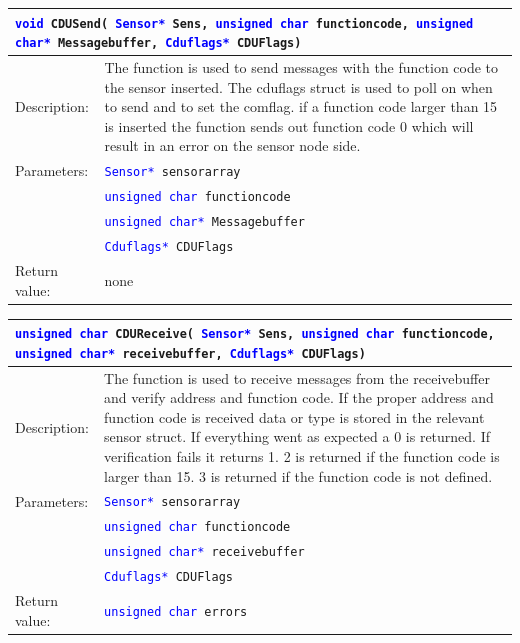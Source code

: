\begin{table}[H]
\begin{tabular}{l p{12.5cm}}
\multicolumn{2}{p{15cm}}{\texttt{\textcolor{blue}{void} CDUSend( \texttt{\textcolor{blue}{Sensor*} Sens, \textcolor{blue}{unsigned char} functioncode, \textcolor{blue}{unsigned char*} Messagebuffer, \textcolor{blue}{Cduflags*} CDUFlags})}} \\
\hline
Description:& The function is used to send messages with the function code to the sensor inserted. The cduflags struct is used to poll on when to send and to set the comflag. if a function code larger than 15 is inserted the function sends out function code 0 which will result in an error on the sensor node side.\\
Parameters:&\texttt{\textcolor{blue}{Sensor*} sensorarray}\\
&\texttt{\textcolor{blue}{unsigned char} functioncode}\\
&\texttt{\textcolor{blue}{unsigned char*} Messagebuffer}\\
&\texttt{\textcolor{blue}{Cduflags*} CDUFlags}\\
Return value:&none\\
\end{tabular}
\end{table}

\begin{table}[H]
\begin{tabular}{l p{12.5cm}}
\multicolumn{2}{p{15cm}}{\texttt{\textcolor{blue}{unsigned char} CDUReceive( \texttt{\textcolor{blue}{Sensor*} Sens, \textcolor{blue}{unsigned char} functioncode, \textcolor{blue}{unsigned char*} receivebuffer, \textcolor{blue}{Cduflags*} CDUFlags})}} \\
\hline
Description:& The function is used to receive messages from the receivebuffer and verify address and function code. If the proper address and function code is received data or type is stored in the relevant sensor struct. If everything went as expected a 0 is returned. If verification fails it returns 1.  2 is returned if the function code is larger than 15. 3 is returned if the function code is not defined.\\
Parameters:&\texttt{\textcolor{blue}{Sensor*} sensorarray}\\
&\texttt{\textcolor{blue}{unsigned char} functioncode}\\
&\texttt{\textcolor{blue}{unsigned char*} receivebuffer}\\
&\texttt{\textcolor{blue}{Cduflags*} CDUFlags}\\
Return value:&\texttt{\textcolor{blue}{unsigned char} errors}\\
\end{tabular}
\end{table}

